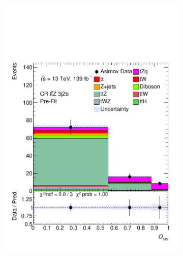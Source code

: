 \begin{figure}[!h]
\begin{subfigure}[b]{0.33\linewidth}
    \includegraphics[width=\textwidth]{ubonn-thesis/Chapters/Chapters_07/Figure/Asmiov/CR_3j2b.pdf} 
  \end{subfigure}%
  \newline
  \begin{subfigure}[b]{0.33\linewidth}
    \centering

\end{subfigure}
\end{figure}
